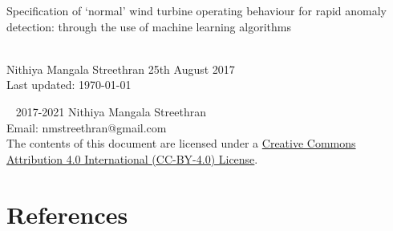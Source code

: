 \documentclass[twoside,12pt,openany]{book}
\def\theauthor{Nithiya Mangala Streethran}
\def\thetitle{%
  Specification of \texorpdfstring{`}{'}normal' wind turbine operating
  behaviour for rapid anomaly detection: through the use of machine
  learning algorithms%
}
\begin{document}
\thefrontmatter

\begin{titlepage}
  \hspace{0pt}\vfill %
  \centering %
  \Large\thetitle
  \\[4cm]
  \large\theauthor
  \vfill
  25th August 2017
  \\[2cm]
  Last updated: \today
  \vfill\hspace{0pt} %
\end{titlepage}

\onehalfspacing

\hspace{0pt}\vfill
\noindent\textcopyright~ 2017-2021 Nithiya Mangala Streethran \\[.5cm]
\noindent Email: nmstreethran@gmail.com \\[.5cm]
\noindent The contents of this document are licensed under a
\href{https://creativecommons.org/licenses/by/4.0/}%
{Creative Commons Attribution 4.0 International (CC-BY-4.0) License}.
\vfill\hspace{0pt}



\contentlists

\themainmatter







{%
  \backmatter%
  \chapter{References}%
  \printbibliography[category=cited,heading=none]%
}

\theappendix


\end{document}
